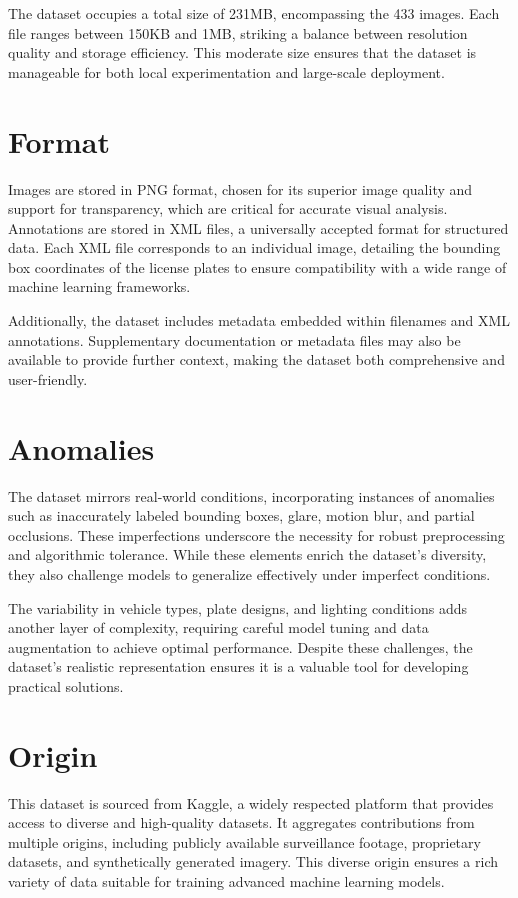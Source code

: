The dataset occupies a total size of 231MB, encompassing the 433 images. Each file ranges between 150KB and 1MB, striking a balance between resolution quality and storage efficiency. This moderate size ensures that the dataset is manageable for both local experimentation and large-scale deployment.

\section{Format}

Images are stored in PNG format, chosen for its superior image quality and support for transparency, which are critical for accurate visual analysis. Annotations are stored in XML files, a universally accepted format for structured data. Each XML file corresponds to an individual image, detailing the bounding box coordinates of the license plates to ensure compatibility with a wide range of machine learning frameworks.

Additionally, the dataset includes metadata embedded within filenames and XML annotations. Supplementary documentation or metadata files may also be available to provide further context, making the dataset both comprehensive and user-friendly.

\section{Anomalies}

The dataset mirrors real-world conditions, incorporating instances of anomalies such as inaccurately labeled bounding boxes, glare, motion blur, and partial occlusions. These imperfections underscore the necessity for robust preprocessing and algorithmic tolerance. While these elements enrich the dataset's diversity, they also challenge models to generalize effectively under imperfect conditions.

The variability in vehicle types, plate designs, and lighting conditions adds another layer of complexity, requiring careful model tuning and data augmentation to achieve optimal performance. Despite these challenges, the dataset's realistic representation ensures it is a valuable tool for developing practical solutions.

\section{Origin}

This dataset is sourced from Kaggle, a widely respected platform that provides access to diverse and high-quality datasets. It aggregates contributions from multiple origins, including publicly available surveillance footage, proprietary datasets, and synthetically generated imagery. This diverse origin ensures a rich variety of data suitable for training advanced machine learning models.


